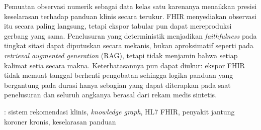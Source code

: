 \begin{singlespace}
Pemuatan observasi numerik sebagai data kelas satu karenanya menaikkan presisi keselarasan
terhadap panduan klinis secara terukur. FHIR menyediakan observasi itu secara paling
langsung, tetapi ekspor tabular pun dapat mereproduksi gerbang yang sama. Penelusuran yang
deterministik menjadikan \emph{faithfulness} pada tingkat sitasi dapat diputuskan secara
mekanis, bukan aproksimatif seperti pada \emph{retrieval augmented generation} (RAG), tetapi
tidak menjamin bahwa setiap kalimat setia secara makna. Keterbatasannya pun
dapat diukur: ekspor FHIR tidak memuat tanggal berhenti pengobatan sehingga logika panduan yang
bergantung pada durasi hanya sebagian yang dapat diterapkan pada saat penelusuran dan seluruh angkanya berasal dari
rekam medis sintetis.

\vspace{6pt}
 : sistem rekomendasi klinis, \emph{knowledge graph}, HL7 FHIR,
penyakit jantung koroner kronis, keselarasan panduan

\end{singlespace}
